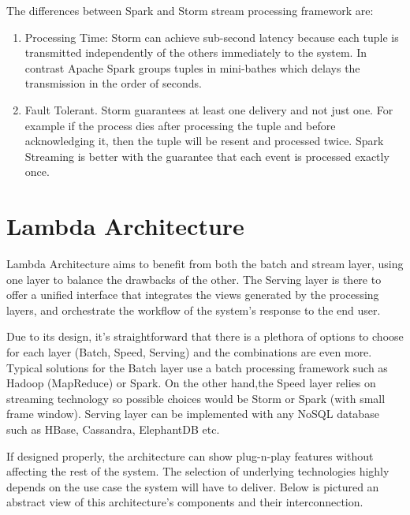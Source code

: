 \documentclass{lmproj}
\begin{document}
The differences between Spark and Storm stream processing framework are:

\begin{enumerate}
	\item Processing Time: Storm can achieve sub-second latency because each tuple is transmitted independently of the others immediately to the system. In contrast Apache Spark groups tuples in mini-bathes which delays the transmission in the order of seconds.
	\item Fault Tolerant. Storm guarantees at least one delivery and not just one. For example if the process dies after processing the tuple and before acknowledging it, then the tuple will be resent and processed twice. Spark Streaming is better with the guarantee that each event is processed exactly once.  
\end{enumerate}

\section{Lambda Architecture}
\label{relatedwork}


Lambda Architecture aims to benefit from both the batch and stream layer, using one layer to balance the drawbacks of the other. The Serving layer is there to offer a unified interface that integrates the views generated by the processing layers, and orchestrate the workflow of the system's response to the end user.

Due to its design, it's straightforward that there is a plethora of options to choose for each layer (Batch, Speed, Serving) and the combinations are even more. Typical solutions for the Batch layer use a batch processing framework such as Hadoop (MapReduce) or Spark. On the other hand,the Speed layer relies on streaming technology so possible choices would be Storm or Spark (with small frame window). Serving layer can be implemented with any NoSQL database such as HBase, Cassandra, ElephantDB etc.

If designed properly, the architecture can show plug-n-play features without affecting the rest of the system. The selection of underlying technologies highly depends on the use case the system will have to deliver. Below is pictured an abstract view of this architecture's components and their interconnection.
\end{document}
